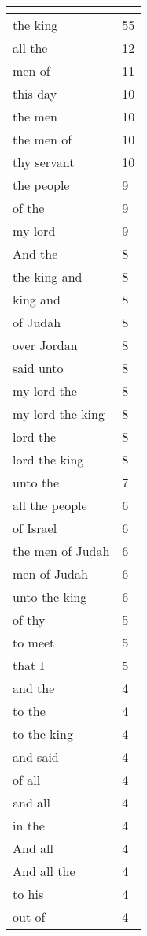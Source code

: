 \begin{center}
\begin{longtable}{|p{3.0in}|p{0.5in}|}
\hline \multicolumn{2}{c}{{ }} \\ \hline
\endfoot 
the king & 55\\ \hline 
all the & 12\\ \hline 
men of & 11\\ \hline 
this day & 10\\ \hline 
the men & 10\\ \hline 
the men of & 10\\ \hline 
thy servant & 10\\ \hline 
the people & 9\\ \hline 
of the & 9\\ \hline 
my lord & 9\\ \hline 
And the & 8\\ \hline 
the king and & 8\\ \hline 
king and & 8\\ \hline 
of Judah & 8\\ \hline 
over Jordan & 8\\ \hline 
said unto & 8\\ \hline 
my lord the & 8\\ \hline 
my lord the king & 8\\ \hline 
lord the & 8\\ \hline 
lord the king & 8\\ \hline 
unto the & 7\\ \hline 
all the people & 6\\ \hline 
of Israel & 6\\ \hline 
the men of Judah & 6\\ \hline 
men of Judah & 6\\ \hline 
unto the king & 6\\ \hline 
of thy & 5\\ \hline 
to meet & 5\\ \hline 
that I & 5\\ \hline 
and the & 4\\ \hline 
to the & 4\\ \hline 
to the king & 4\\ \hline 
and said & 4\\ \hline 
of all & 4\\ \hline 
and all & 4\\ \hline 
in the & 4\\ \hline 
And all & 4\\ \hline 
And all the & 4\\ \hline 
to his & 4\\ \hline 
out of & 4\\ \hline 

\end{longtable}
\end{center}
